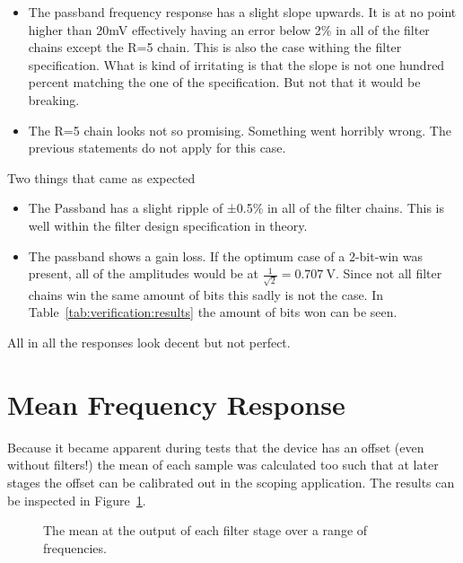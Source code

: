 \begin{itemize}
    \item The passband frequency response has a slight slope upwards. It is at no point higher than 20mV effectively having an error below 2\% in all of the filter chains except the R=5 chain. This is also the case withing the filter specification. What is kind of irritating is that the slope is not one hundred percent matching the one of the specification. But not that it would be breaking.
    \item The R=5 chain looks not so promising. Something went horribly wrong. The previous statements do not apply for this case.
\end{itemize}

Two things that came as expected
\begin{itemize}
    \item The Passband has a slight ripple of ±0.5\% in all of the filter chains. This is well within the filter design specification in theory.
    \item The passband shows a gain loss. If the optimum case of a 2-bit-win was present, all of the amplitudes would be at $\frac{1}{\sqrt{2}} = \SI{0.707}{\V}$.
    Since not all filter chains win the same amount of bits this sadly is not the case. In Table~\ref{tab:verification:results} the amount of bits won can be seen.
\end{itemize}

All in all the responses look decent but not perfect.

\section{Mean Frequency Response}
\label{sec:verification:mean}

Because it became apparent during tests that the device has an offset (even without filters!) the mean of each sample was calculated too such that at later stages the offset can be calibrated out in the scoping application.
The results can be inspected in Figure~\ref{fig:verification:rmsAll}.

\begin{figure}
    \centering
    
    \caption[The mean at the output of each filter stage over a range of frequencies.]{%
        The mean at the output of each filter stage over a range of frequencies.%
    }
    \label{fig:verification:rmsAll}
\end{figure}


